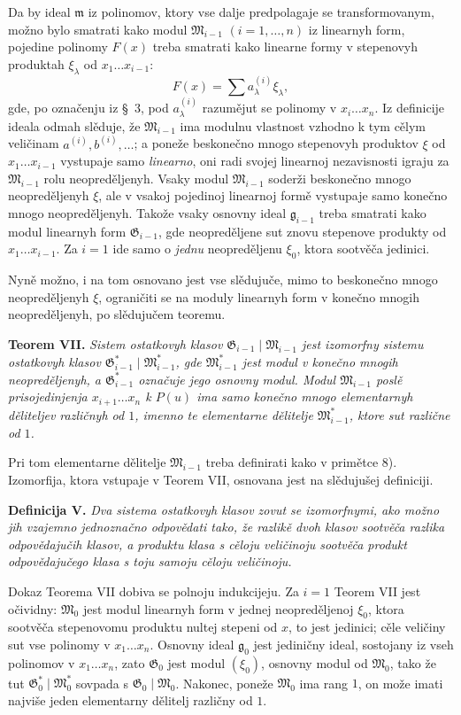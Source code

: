 \documentclass[11pt]{article}
\providecommand{\Gmod}{\mathfrak G}
\providecommand{\Mmod}{\mathfrak M}
\providecommand{\mideal}{\mathfrak m}
\providecommand{\gideal}{\mathfrak g}
\begin{document}
Da by ideal $\mideal$ iz polinomov, ktory vse dalje predpolagaje se transformovanym, možno bylo smatrati kako modul $\Mmod_{i-1}$ $(i=1,\ldots,n)$ iz linearnyh form, pojedine polinomy $F(x)$ treba smatrati kako linearne formy v stepenovyh produktah $\xi_\lambda$ od $x_1\ldots x_{i-1}$:
\[
  F(x)=\sum a^{(i)}_\lambda\xi_\lambda,
\]
gde, po označenju iz §~3, pod $a^{(i)}_\lambda$ razumějut se polinomy v $x_i\ldots x_n$. Iz definicije ideala odmah slěduje, že $\Mmod_{i-1}$ ima modulnu vlastnost vzhodno k tym cělym veličinam $a^{(i)},b^{(i)},\ldots$; a poneže beskonečno mnogo stepenovyh produktov $\xi$ od $x_1\ldots x_{i-1}$ vystupaje samo {\itshape linearno}, oni radi svojej linearnoj nezavisnosti igraju za $\Mmod_{i-1}$ rolu neopreděljenyh. Vsaky modul $\Mmod_{i-1}$ soderži beskonečno mnogo neopreděljenyh $\xi$, ale v vsakoj pojedinoj linearnoj formě vystupaje samo konečno mnogo neopreděljenyh. Takože vsaky osnovny ideal $\gideal_{i-1}$ treba smatrati kako modul linearnyh form $\Gmod_{i-1}$, gde neopreděljene sut znovu stepenove produkty od $x_1\ldots x_{i-1}$. Za $i=1$ ide samo o {\itshape jednu} neopreděljenu $\xi_0$, ktora sootvěča jedinici.

Nyně možno, i na tom osnovano jest vse slědujuče, mimo to beskonečno mnogo neopreděljenyh $\xi$, ograničiti se na moduly linearnyh form v konečno mnogih neopreděljenyh, po slědujučem teoremu.

\medskip
\noindent\textbf{Teorem VII.} {\itshape Sistem ostatkovyh klasov $\Gmod_{i-1}\mid \Mmod_{i-1}$ jest izomorfny sistemu ostatkovyh klasov $\Gmod^*_{i-1}\mid \Mmod^*_{i-1}$, gde $\Mmod^*_{i-1}$ jest modul v konečno mnogih neopreděljenyh, a $\Gmod^*_{i-1}$ označuje jego osnovny modul. Modul $\Mmod_{i-1}$ poslě prisojedinjenja $x_{i+1}\ldots x_n$ k $P(u)$ ima samo konečno mnogo elementarnyh děliteljev različnyh od $1$, imenno te elementarne dělitelje $\Mmod^*_{i-1}$, ktore sut različne od $1$.}

Pri tom elementarne dělitelje $\Mmod_{i-1}$ treba definirati kako v primětce 8). Izomorfija, ktora vstupaje v Teorem VII, osnovana jest na slědujušej definiciji.

\medskip
\noindent\textbf{Definicija V.} {\itshape Dva sistema ostatkovyh klasov zovut se izomorfnymi, ako možno jih vzajemno jednoznačno odpovědati tako, že razlikě dvoh klasov sootvěča razlika odpovědajučih klasov, a produktu klasa s cěloju veličinoju sootvěča produkt odpovědajučego klasa s toju samoju cěloju veličinoju.}

Dokaz Teorema VII dobiva se polnoju indukcijeju. Za $i=1$ Teorem VII jest očividny: $\Mmod_0$ jest modul linearnyh form v jednej neopreděljenoj $\xi_0$, ktora sootvěča stepenovomu produktu nultej stepeni od $x$, to jest jedinici; cěle veličiny sut vse polinomy v $x_1\ldots x_n$. Osnovny ideal $\gideal_0$ jest jediničny ideal, sostojany iz vseh polinomov v $x_1\ldots x_n$, zato $\Gmod_0$ jest modul $(\xi_0)$, osnovny modul od $\Mmod_0$, tako že tut $\Gmod^*_0\mid\Mmod^*_0$ sovpada s $\Gmod_0\mid\Mmod_0$. Nakonec, poneže $\Mmod_0$ ima rang $1$, on može imati najviše jeden elementarny dělitelj različny od $1$.
\end{document}
